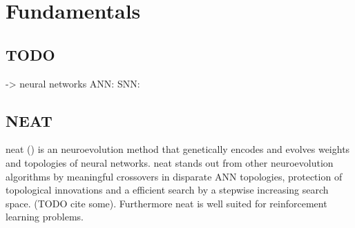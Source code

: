 
\chapter{Fundamentals}\label{Basics}
\section{TODO}
-> neural networks
ANN: 
SNN:


\section{NEAT}\label{NEAT} %
\Gls{neat} (\cite{NEAT}) is an neuroevolution method that genetically encodes and evolves weights and topologies of neural networks. \gls{neat} stands out from other neuroevolution algorithms by meaningful crossovers in disparate ANN topologies, protection of topological innovations and a efficient search by a stepwise increasing search space. (TODO cite some). Furthermore \gls{neat} is well suited for reinforcement learning problems. 

